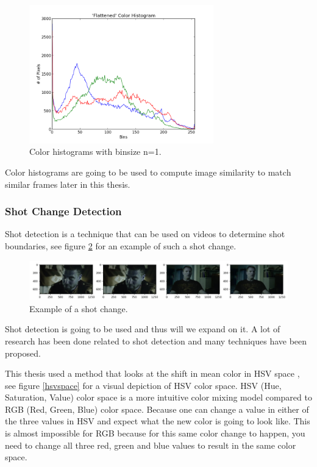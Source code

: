 \documentclass{article}
\begin{document}
\begin{figure}[H]
	\includegraphics[width=8cm]{images/colorhistogram.png}
	\centering
	\caption{Color histograms with binsize n=1.}
	\label{fig:colorhistogram}
\end{figure}

Color histograms are going to be used to compute image similarity to match similar frames later in this thesis.

\subsubsection{Shot Change Detection}

Shot detection is a technique that can be used on videos to determine shot boundaries, see figure \ref{shotchange} for an example of such a shot change. 

\begin{figure}[H]
	\includegraphics[width=12cm]{images/shotchange.jpg}
	\centering
	\caption{Example of a shot change.}
	\label{shotchange}
\end{figure}

Shot detection is going to be used and thus will we expand on it. A lot of research has been done related to shot detection \cite{lienhart1998comparison} and many techniques have been proposed. 

This thesis used a method that looks at the shift in mean color in HSV space \cite{shao2015shot}, see figure \ref{hsvspace} for a visual depiction of HSV color space. HSV (Hue, Saturation, Value) color space is a more intuitive color mixing model compared to RGB (Red, Green, Blue) color space. Because one can change a value in either of the three values in HSV and expect what the new color is going to look like. This is almost impossible for RGB because for this same color change to happen, you need to change all three red, green and blue values to result in the same color space.
\end{document}
